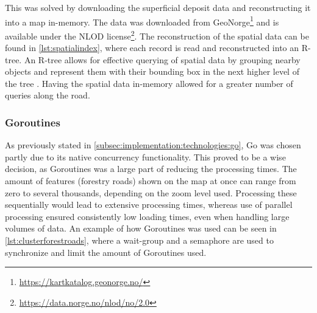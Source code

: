 This was solved by downloading the superficial deposit data and reconstructing it into a map in-memory. The data was downloaded from GeoNorge\footnote{\url{https://kartkatalog.geonorge.no/}} and is available under the NLOD license\footnote{\url{https://data.norge.no/nlod/no/2.0}}. The reconstruction of the spatial data can be found in \autoref{lst:spatialindex}, where each record is read and reconstructed into an R-tree. An R-tree allows for effective querying of spatial data by grouping nearby objects and represent them with their bounding box in the next higher level of the tree \cite{rtreewikipedia}. Having the spatial data in-memory allowed for a greater number of queries along the road.

\begin{figure}[h]

\end{figure}

\subsubsection{Goroutines}

As previously stated in \autoref{subsec:implementation:technologies:go}, Go was chosen partly due to its native concurrency functionality. This proved to be a wise decision, as Goroutines was a large part of reducing the processing times. The amount of features (forestry roads) shown on the map at once can range from zero to several thousands, depending on the zoom level used. Processing these sequentially would lead to extensive processing times, whereas use of parallel processing ensured consistently low loading times, even when handling large volumes of data. An example of how Goroutines was used can be seen in \autoref{lst:clusterforestroads}, where a wait-group and a semaphore are used to synchronize and limit the amount of Goroutines used.

